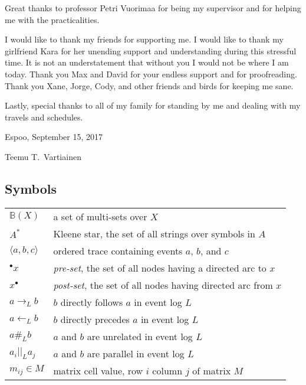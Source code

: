 Great thanks to professor Petri Vuorimaa for being my supervisor and for helping me with the practicalities.

I would like to thank my friends for supporting me.
I would like to thank my girlfriend Kara for her unending support and understanding during this stressful time.
It is not an understatement that without you I would not be where I am today.
Thank you Max and David for your endless support and for proofreading.
Thank you Xane, Jorge, Cody, and other friends and birds for keeping me sane.

Lastly, special thanks to all of my family for standing by me and dealing with my travels and schedules.

\vspace{1cm}
\noindent
Espoo, September 15, 2017

\vspace{5mm}
\noindent
Teemu T.\ Vartiainen

\newpage
\thesistableofcontents


\subsection*{Symbols}

\begin{tabularx}{\linewidth}{l X}
$\mathbb{B}(X)$             & a set of multi-sets over $X$ \\
$A^*$                       & Kleene star, the set of all strings over symbols in $A$ \\
$\langle a,b,c \rangle$     & ordered trace containing events $a$, $b$, and $c$ \\
${}^\bullet x$              & \emph{pre-set}, the set of all nodes having a directed arc to $x$ \\
$x^\bullet$                 & \emph{post-set}, the set of all nodes having directed arc from $x$ \\
$a \rightarrow_L b$         & $b$ directly follows $a$ in event log $L$ \\
$a \leftarrow_L b$          & $b$ directly precedes $a$ in event log $L$ \\
$a \#_L b$                  & $a$ and $b$ are unrelated in event log $L$ \\
$a_i ||_L a_j$              & $a$ and $b$ are parallel in event log $L$ \\
$m_{ij} \in M$              & matrix cell value, row $i$ column $j$ of matrix $M$ \\
\end{tabularx}


